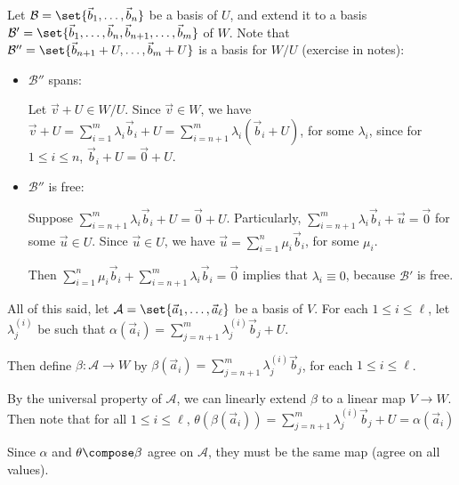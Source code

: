 \documentclass[a4paper,12pt]{article}
\begin{document}
Let \(\mathcal B = \set{\vec b_1, \dotsc, \vec b_n}\) be a basis of \(U\), and
extend it to a basis
\(\mathcal B'
   = \set{\vec b_1, \dotsc, \vec b_n, \vec b_{n + 1}, \dotsc, \vec b_m}\)
of \(W\). Note that
\(\mathcal B'' = \set{\vec b_{n + 1} + U, \dotsc, \vec b_m + U}\) is a basis for
\(W/U\) (exercise in notes):
\begin{itemize}
 \item
  \(\mathcal B''\) spans:

  Let \(\vec v + U \in W/U\). Since \(\vec v \in W\), we have
  \(\vec v + U
     = \sum_{i = 1}^m \lambda_i \vec b_i + U
     = \sum_{i = n + 1}^m \lambda_i (\vec b_i + U)\), for some \(\lambda_i\),
  since for \(1 \le i \le n\), \(\vec b_i + U = \vec 0 + U\).
 \item
  \(\mathcal B''\) is free:

  Suppose \(\sum_{i = n + 1}^m \lambda_i \vec b_i + U = \vec 0 + U\).
  Particularly, \(\sum_{i = n + 1}^m \lambda_i \vec b_i + \vec u = \vec 0\) for
  some \(\vec u \in U\). Since \(\vec u \in U\), we have
  \(\vec u = \sum_{i = 1}^n \mu_i \vec b_i\), for some \(\mu_i\).

  Then
  \(\sum_{i = 1}^n \mu_i \vec b_i + \sum_{i = n + 1}^m \lambda_i \vec b_i
    = \vec 0\)
  implies that \(\lambda_i \equiv 0\), because \(\mathcal B'\) is free.
\end{itemize}
All of this said, let
\(\mathcal A = \set{\vec a_1, \dotsc, \vec a_\ell}\) be a basis of \(V\). For
each \(1 \le i \le \ell\), let \(\lambda_j^{(i)}\) be such that
\(\alpha(\vec a_i) = \sum_{j = n + 1}^m \lambda_j^{(i)} \vec b_j + U\).

Then define \(\beta: \mathcal A \to W\) by
\(\beta(\vec a_i) = \sum_{j = n + 1}^m \lambda_j^{(i)} \vec b_j\), for each
\(1 \le i \le \ell\).

By the universal property of \(\mathcal A\), we can linearly extend \(\beta\) to
a linear map \(V \to W\). Then note that for all \(1 \le i \le \ell\),
\(\theta(\beta(\vec a_i))
   = \sum_{j = n + 1}^m \lambda_j^{(i)} \vec b_j + U
   = \alpha(\vec a_i)\)

Since \(\alpha\) and \(\theta \compose \beta\) agree on \(\mathcal A\), they
must be the same map (agree on all values).
\end{document}
